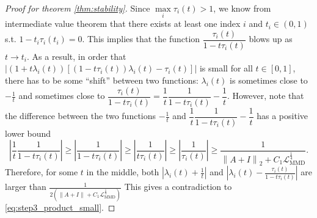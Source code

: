 \documentclass{article} %
\theoremstyle{plain}
\theoremstyle{definition}
\theoremstyle{remark}
\newcommand{\norm}[2][H^s]{\left\|#2\right\|_{#1}}
\newcommand{\LMMD}{\mathcal{L}_{\text{MMD}}}
\newcommand{\lam}{\lambda}
\newcommand{\sqbra}[1]{\left[#1\right]}
\newcommand{\abs}[1]{\left|#1\right|}
\begin{document}
\begin{proof}[Proof for theorem \ref{thm:stability}]
Since $\max\limits_i\tau_i(t) > 1$, we know from intermediate value theorem that there exists at least one index $i$ and $t_i \in (0,1)$ s.t. $1 - t_i \tau_i(t_i) = 0$. This implies that the function $\dfrac{\tau_i(t)}{1 - t \tau_i(t)}$ blows up as $t \to t_i$. As a result, in order that $\abs{(1 + t\lam_i(t)) \sqbra{ (1-t \tau_i(t)) \lam_i(t) - \tau_i(t)}}$ is small for all $t \in [0,1]$, there has to be some ``shift'' between two functions: $\lam_i(t)$ is sometimes close to $-\frac{1}{t}$ and sometimes close to $\dfrac{\tau_i(t)}{1 - t \tau_i(t)} = \dfrac{1}{t} \dfrac{1}{1 - t \tau_i(t)} -\dfrac{1}{t}$. 
However, note that the difference between the two functions $-\frac{1}{t}$ and $\dfrac{1}{t} \dfrac{1}{1 - t \tau_i(t)} -\dfrac{1}{t}$ has a positive lower bound
\begin{equation}\label{eq:step3_lower_bound}
\abs{\dfrac{1}{t} \dfrac{1}{1 - t \tau_i(t)}} \ge \abs{\dfrac{1}{1 - t \tau_i(t)}} \ge \abs{\dfrac{1}{t \tau_i(t)}} \ge \abs{\dfrac{1}{ \tau_i(t)}} \ge \dfrac{1}{\norm[2]{A+I}+C_1 \LMMD^{\frac14}}.
\end{equation}
Therefore, for some $t$ in the middle, both $\abs{\lam_i(t) + \frac{1}{t}}$ and $\abs{\lam_i(t) - \frac{\tau_i(t)}{1-t\tau_i(t)}}$ are larger than $\frac{1}{2(\norm[]{A+I}+C_1 \LMMD^{\frac14})}$
This gives a contradiction to \eqref{eq:step3_product_small}. 


\end{proof}
\end{document}
